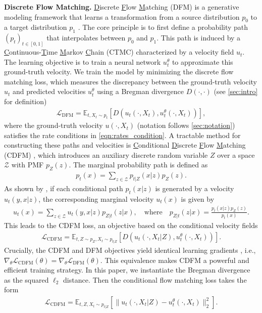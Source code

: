 \documentclass[12pt]{article}
\numberwithin{equation}{section}
\let\cite\citep
\theoremstyle{theoremstyle}
\numberwithin{equation}{section}
\numberwithin{theorem}{section}
\numberwithin{proposition}{section}
\numberwithin{definition}{section}
\numberwithin{lemma}{section}
\numberwithin{assumption}{section}
\numberwithin{remark}{section}
\begin{document}
\textbf{Discrete Flow Matching.}
\underline{D}iscrete \underline{F}low \underline{M}atching (DFM) is a generative modeling framework that learns a transformation from a source distribution $p_0$ to a target distribution $p_1$ \cite{campbell2024generative,gat2024discrete, lipman2024flow}. The core principle is to first define a probability path $(p_t)_{t \in [0, 1]}$ that interpolates between $p_0$ and $p_1$. This path is induced by a \underline{C}ontinuous-\underline{T}ime \underline{M}arkov \underline{C}hain (CTMC) characterized by a velocity field $u_t$. The learning objective is to train a neural network $u_t^\theta$ to approximate this ground-truth velocity.
We train the model by minimizing the discrete flow matching loss, which measures the discrepancy between the ground-truth velocity $u_t$ and predicted velocities $u_t^\theta$ using a Bregman divergence $D(\cdot,\cdot)$ (see \cref{sec:intro} for definition)
\begin{align*}
    \mathcal{L}_{\text{DFM}} = \mathbb{E}_{t, X_t \sim p_t} \left[ D(u_t(\cdot, X_t), u_t^\theta(\cdot, X_t)) \right],
\end{align*}
where the ground-truth velocity $u(\cdot, X_t)$ (notation follows \cref{sec:notation}) satisfies the rate conditions in \eqref{eqn:rates_condition}.
A tractable method for constructing these paths and velocities is \underline{C}onditional \underline{D}iscrete \underline{F}low \underline{M}atching (CDFM) \cite{campbell2024generative, gat2024discrete}, which introduces an auxiliary discrete random variable $Z$ over a space $\mathcal{Z}$ with PMF $p_Z(z)$. 
The marginal probability path is defined as
\begin{align*}
    p_t(x) = \sum_{z \in \mathcal{Z}} p_{t|Z}(x|z) p_Z(z).  
\end{align*}
As shown by \cite{lipman2024flow}, if each conditional path $p_t(x|z)$ is generated by a velocity $u_t(y,x|z)$, the corresponding marginal velocity $u_t(x)$ is given by
\begin{align*}
    u_t(x) = \sum_{z \in \mathcal{Z}} u_t(y,x|z) p_{Z|t}(z|x), \quad \text{where} \quad p_{Z|t}(z|x) = \frac{p_t(x|z) p_Z(z)}{p_t(x)}. 
\end{align*}
This leads to the CDFM loss, an objective based on the conditional velocity fields
\begin{align*}
    \mathcal{L}_{\text{CDFM}} = \mathbb{E}_{t, Z \sim p_Z, X_t \sim p_{t|Z}} \left[ D(u_t(\cdot,X_t|Z), u_t^\theta(\cdot,X_t)) \right].
\end{align*}
Crucially, the CDFM and DFM objectives yield identical learning gradients \cite[Theorem 15]{lipman2024flow}, i.e., $\nabla_{\theta} \mathcal{L}_{\text{CDFM}}(\theta) = \nabla_{\theta} \mathcal{L}_{\text{DFM}}(\theta)$. This equivalence makes CDFM a powerful and efficient training strategy. In this paper, we instantiate the Bregman divergence as the squared $\ell_2$ distance. 
Then the conditional flow matching loss takes the form
\begin{align}
\label{eqn:cdfm_loss_mse}
\mathcal{L}_{\text{CDFM}} = \mathbb{E}_{t, Z, X_t \sim p_{t|Z}} \left[ \| u_t(\cdot,X_t|Z) - u_t^\theta(\cdot,X_t) \|_2^2 \right].
\end{align}
\end{document}
